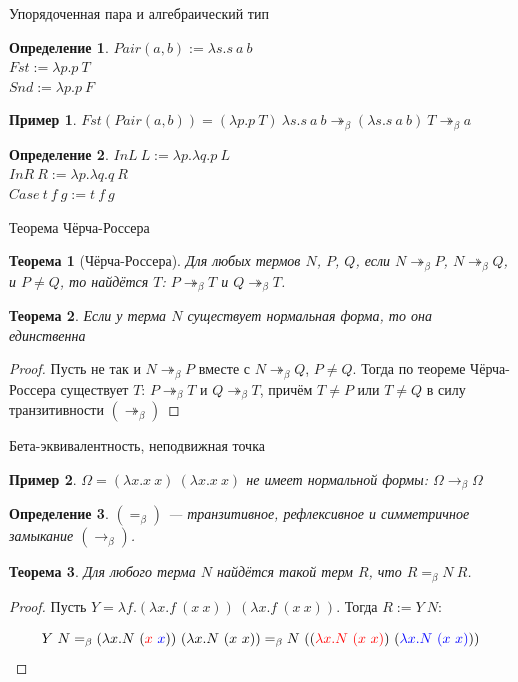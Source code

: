 \documentclass[aspectratio=169]{beamer}
\newtheorem{thm}{Теорема}[section]
\newtheorem{dfn}{Определение}[section]
\newtheorem{exm}{Пример}[section]
\begin{document}
\begin{frame}{Упорядоченная пара и алгебраический тип}
\begin{dfn}$Pair(a,b) := \lambda s.s\ a\ b$\\
$Fst := \lambda p.p\ T$\\
$Snd := \lambda p.p\ F$
\end{dfn}

\begin{exm}
$Fst (Pair (a,b)) = (\lambda p.p\ T)\ \lambda s.s\ a\ b \twoheadrightarrow_\beta (\lambda s.s\ a\ b)\ T \twoheadrightarrow_\beta a$
\end{exm}

\begin{dfn}
$InL\ L := \lambda p.\lambda q.p\ L$\\
$InR\ R := \lambda p.\lambda q.q\ R$\\
$Case\ t\ f\ g := t\ f\ g$
\end{dfn}

\end{frame}

\begin{frame}{Теорема Чёрча-Россера}
\begin{thm}[Чёрча-Россера] Для любых термов $N$, $P$, $Q$, если $N \twoheadrightarrow_\beta P$, $N \twoheadrightarrow_\beta Q$,
и $P \ne Q$, то найдётся $T$: $P \twoheadrightarrow_\beta T$ и $Q \twoheadrightarrow_\beta T$.\end{thm}
\begin{thm}Если у терма $N$ существует нормальная форма, то она единственна\end{thm}
\begin{proof}Пусть не так и $N \twoheadrightarrow_\beta P$ вместе с $N \twoheadrightarrow_\beta Q$, $P \ne Q$.
Тогда по теореме Чёрча-Россера существует $T$: $P \twoheadrightarrow_\beta T$ и $Q \twoheadrightarrow_\beta T$,
причём $T \ne P$ или $T \ne Q$ в силу транзитивности $(\twoheadrightarrow_\beta)$\end{proof}
\end{frame}

\begin{frame}{Бета-эквивалентность, неподвижная точка}
\begin{exm}$\Omega = (\lambda x.x\ x)\ (\lambda x.x\ x)$ не имеет нормальной формы:
$\Omega \rightarrow_\beta \Omega$\end{exm}
\begin{dfn}$(=_\beta)$ --- транзитивное, рефлексивное и симметричное замыкание $(\rightarrow_\beta)$.\end{dfn}
\begin{thm}Для любого терма $N$ найдётся такой терм $R$, что $R =_\beta N\ R$.\end{thm}
\begin{proof}Пусть $Y = \lambda f.(\lambda x.f\ (x\ x))\ (\lambda x.f\ (x\ x))$.
Тогда $R := Y\ N$:

$$Y\ N =_\beta (\lambda x.N\ ({\color{red}x}\ {\color{blue}x}))\ (\lambda x.N\ (x\ x)) =_\beta N\ (({\color{red}\lambda x.N\ (x\ x)})\ ({\color{blue}\lambda x.N\ (x\ x)}))$$
\end{proof}
\end{frame}
\end{document}
